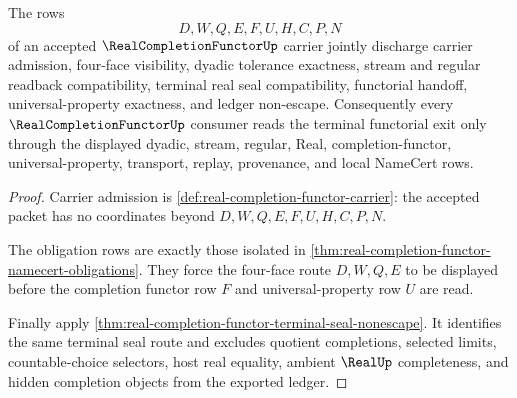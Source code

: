 \begin{theorem}
\label{thm:real-completion-functor-obligation-closure}
The rows
$$
D,W,Q,E,F,U,H,C,P,N
$$
of an accepted $\RealCompletionFunctorUp$ carrier jointly discharge carrier admission, four-face visibility, dyadic tolerance exactness, stream and regular readback compatibility, terminal real seal compatibility, functorial handoff, universal-property exactness, and ledger non-escape. Consequently every $\RealCompletionFunctorUp$ consumer reads the terminal functorial exit only through the displayed dyadic, stream, regular, Real, completion-functor, universal-property, transport, replay, provenance, and local NameCert rows.
\end{theorem}
\begin{proof}
Carrier admission is \autoref{def:real-completion-functor-carrier}: the accepted packet has no coordinates beyond $D,W,Q,E,F,U,H,C,P,N$.

The obligation rows are exactly those isolated in \autoref{thm:real-completion-functor-namecert-obligations}. They force the four-face route $D,W,Q,E$ to be displayed before the completion functor row $F$ and universal-property row $U$ are read.

Finally apply \autoref{thm:real-completion-functor-terminal-seal-nonescape}. It identifies the same terminal seal route and excludes quotient completions, selected limits, countable-choice selectors, host real equality, ambient $\RealUp$ completeness, and hidden completion objects from the exported ledger.
\end{proof}



